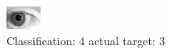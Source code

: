 \begin{figure}[h!]
\begin{center}
\includegraphics[width=0.60\columnwidth]{figures/ID199_class_4_target_3.png}
\end{center}
\caption{ Classification: 4 actual target: 3}
\label{fig:ID199_class_4_target_3}
\end{figure}
